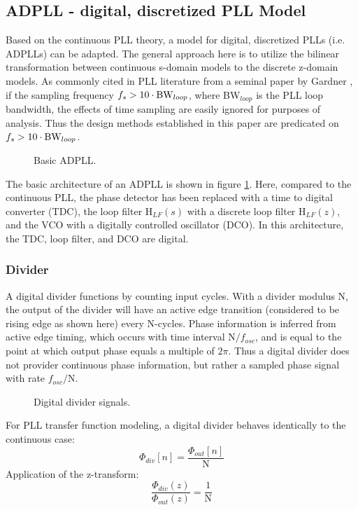 \subsection{ADPLL - digital, discretized PLL Model}
	Based on the continuous PLL theory, a model for digital, discretized PLLs (i.e. ADPLLs) can be adapted. The general approach here is to utilize the bilinear transformation between continuous s-domain models to the discrete z-domain models. As commonly cited in PLL literature from a seminal paper by Gardner \cite{gardner_1980}, if the sampling frequency $f_s > 10\cdot\textnormal{BW}_{loop}$, where BW$_{loop}$ is the PLL loop bandwidth, the effects of time sampling are easily ignored for purposes of analysis. Thus the design methods established in this paper are predicated on $f_s > 10\cdot\textnormal{BW}_{loop}$.
	\begin{figure}[htb!]
		\center
		\caption{Basic ADPLL.}
		\label{fig:basic_adpll}
	\end{figure}
	\FloatBarrier
	The basic architecture of an ADPLL is shown in figure \ref{fig:basic_adpll}. Here, compared to the continuous PLL, the phase detector has been replaced with a time to digital converter (TDC), the loop filter $\mathrm{H}_{LF}(s)$ with a discrete loop filter $\mathrm{H}_{LF}(z)$, and the VCO with a digitally controlled oscillator (DCO). In this architecture, the TDC, loop filter, and DCO are digital. 

	\subsubsection{Divider}
		A digital divider functions by counting input cycles. With a divider modulus N, the output of the divider will have an active edge transition (considered to be rising edge as shown here) every N-cycles. Phase information is inferred from active edge timing, which occurs with time interval N$/f_{osc}$, and is equal to the point at which output phase equals a multiple of $2\pi$. Thus a digital divider does not provider continuous phase information, but rather a sampled phase signal with rate $f_{osc}/$N. 
		\begin{figure}[htb!]
			\center
			\caption{Digital divider signals.}
			\label{fig:gigital_div}
		\end{figure}
		\FloatBarrier
		For PLL transfer function modeling, a digital divider behaves identically to the continuous case:
		\begin{equation}
			\Phi_{div}[n] = \frac{\Phi_{out}[n]}{\mathrm{N}}
		\end{equation}
		Application of the z-transform:
		\begin{equation}
			\frac{\Phi_{div}(z)}{\Phi_{out}(z)} = \frac{1}{\mathrm{N}}
		\end{equation}

